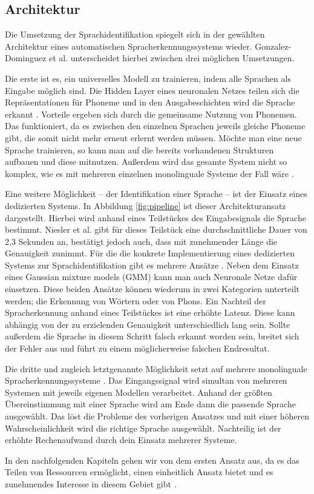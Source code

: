 \subsection{Architektur}
Die Umsetzung der Sprachidentifikation spiegelt sich in der gewählten Architektur eines automatischen Spracherkennungssystems wieder. Gonzalez-Dominguez et al. \cite{Gonzalez.2015} unterscheidet hierbei zwischen drei möglichen Umsetzungen.

Die erste ist es, ein universelles Modell zu trainieren, indem alle Sprachen als Eingabe möglich sind. Die Hidden Layer eines neuronalen Netzes teilen sich die Repräsentationen für Phoneme und in den Ausgabeschichten wird die Sprache erkannt \cite{Yu.2014}.
Vorteile ergeben sich durch die gemeinsame Nutzung von Phonemen. Das funktioniert, da es zwischen den einzelnen Sprachen jeweils gleiche Phoneme gibt, die somit nicht mehr erneut erlernt werden müssen.
Möchte man eine neue Sprache trainieren, so kann man auf die bereits vorhandenen Strukturen aufbauen und diese mitnutzen.
Außerdem wird das gesamte System nicht so komplex, wie es mit mehreren einzelnen monolinguale Systeme der Fall wäre \cite{Bartz.2017}.

Eine weitere Möglichkeit – der Identifikation einer Sprache – ist der Einsatz eines dedizierten Systems. In Abbildung \ref{fig:pipeline} ist dieser Architekturansatz
dargestellt. Hierbei wird anhand eines Teilstückes des Eingabesignals die Sprache bestimmt. Niesler et al. \cite{Niesler.2006} gibt für dieses Teilstück eine durchschnittliche Dauer von 2,3 Sekunden an,
bestätigt jedoch auch, dass mit zunehmender Länge die Genauigkeit zunimmt.
Für die die konkrete Implementierung eines dedizierten Systems zur Sprachidentifikation gibt es mehrere Ansätze \cite{Niesler.2006}. Neben dem Einsatz eines Gaussian mixture models (GMM) kann man auch Neuronale Netze dafür einsetzen.
Diese beiden Ansätze können wiederum in zwei Kategorien unterteilt werden; die Erkennung von Wörtern oder von Phons.
Ein Nachteil der Spracherkennung anhand eines Teilstückes ist eine erhöhte Latenz. Diese kann abhängig von der zu erzielenden Genauigkeit unterschiedlich lang sein.
Sollte außerdem die Sprache in diesem Schritt falsch erkannt worden sein,
breitet sich der Fehler aus und führt zu einem möglicherweise falschen Endresultat.

Die dritte und zugleich letztgenannte Möglichkeit setzt auf mehrere monolinguale Spracherkennungssysteme \cite{Gonzalez.2015}.
Das Eingangssignal wird simultan von mehreren Systemen mit jeweils eigenen Modellen verarbeitet.
Anhand der größten Übereinstimmung mit einer Sprache wird am Ende dann die passende Sprache ausgewählt.
Das löst die Probleme des vorherigen Ansatzes und mit einer höheren Wahrscheinlichkeit wird die richtige Sprache ausgewählt.
Nachteilig ist der erhöhte Rechenaufwand durch dein Einsatz mehrerer Systeme.

In den nachfolgenden Kapiteln gehen wir von dem ersten Ansatz aus, da es das Teilen von Ressourcen ermöglicht, einen einheitlich Ansatz bietet
und es zunehmendes Interesse in diesem Gebiet gibt \cite{Yu.2014, Hara.2017}.